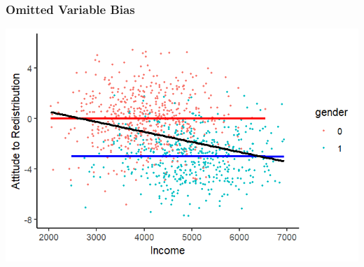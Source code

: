 \documentclass[xcolor=x11names,compress]{beamer}\usepackage[]{graphicx}\usepackage[]{color}
\makeatletter
\def\maxwidth{ %
  \ifdim\Gin@nat@width>\linewidth
    \linewidth
  \else
    \Gin@nat@width
  \fi
}
\newenvironment{knitrout}{}{} %
\renewcommand{\(}{\begin{columns}}
\renewcommand{\)}{\end{columns}}
\newcommand{\<}[1]{\begin{column}{#1}}
\renewcommand{\>}{\end{column}}
\makeatother
\begin{document}
\begin{frame}
\frametitle{Omitted Variable Bias}
\begin{knitrout}
\color{fgcolor}
\includegraphics[width=\maxwidth]{figure/confound3-1} 

\end{knitrout}
\end{frame}


\end{document}
